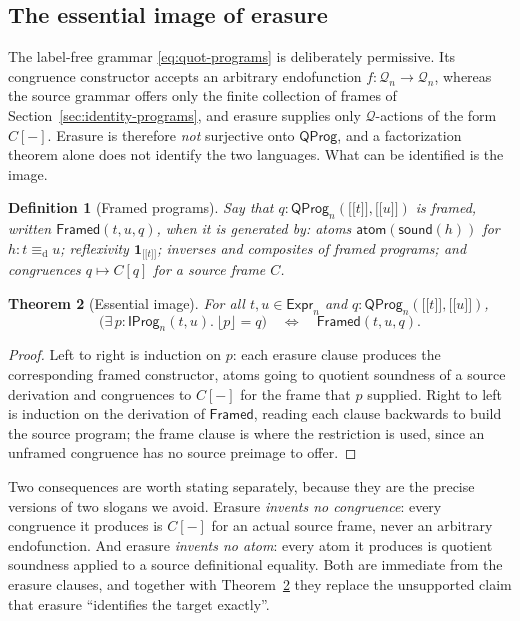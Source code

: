 \documentclass[10pt,reqno]{amsart}
\newtheorem{theorem}{Theorem}[section]
\newtheorem{definition}[theorem]{Definition}
\newcommand{\Expr}{\mathsf{Expr}}
\newcommand{\IProg}{\mathsf{IProg}}
\newcommand{\den}[1]{\mathopen{\lbrack\!\lbrack}#1\mathclose{\rbrack\!\rbrack}}
\newcommand{\defeq}{\mathrel{\equiv_{\mathrm d}}}
\newcommand{\QProg}{\mathsf{QProg}}
\newcommand{\Framed}{\mathsf{Framed}}
\newcommand{\Q}{\mathcal{Q}}
\begin{document}
\subsection{The essential image of erasure}
\label{subsec:erasure-image}

The label-free grammar \eqref{eq:quot-programs} is deliberately permissive.  Its
congruence constructor accepts an arbitrary endofunction \(f:\Q_n\to\Q_n\),
whereas the source grammar offers only the finite collection of frames of
Section~\ref{sec:identity-programs}, and erasure supplies only \(\Q\)-actions of
the form \(C[-]\).  Erasure is therefore \emph{not} surjective onto
\(\QProg\), and a factorization theorem alone does not identify the two
languages.  What can be identified is the image.

\begin{definition}[Framed programs]
\label{def:framed}
Say that \(q:\QProg_n(\den t,\den u)\) is \emph{framed}, written
\(\Framed(t,u,q)\), when it is generated by:
atoms \(\mathsf{atom}(\mathsf{sound}(h))\) for \(h:t\defeq u\); reflexivity
\(\mathbf1_{\den t}\); inverses and composites of framed programs; and
congruences \(q\mapsto C[q]\) for a source frame \(C\).
\end{definition}

\begin{theorem}[Essential image]
\label{thm:erasure-image}
For all \(t,u\in\Expr_n\) and \(q:\QProg_n(\den t,\den u)\),
\[
 \bigl(\exists\,p:\IProg_n(t,u).\ \lfloor p\rfloor=q\bigr)
 \quad\Longleftrightarrow\quad
 \Framed(t,u,q).
\tag{9.5}\label{eq:erasure-image}
\]
\end{theorem}

\begin{proof}
Left to right is induction on \(p\): each erasure clause produces the
corresponding framed constructor, atoms going to quotient soundness of a source
derivation and congruences to \(C[-]\) for the frame that \(p\) supplied.  Right
to left is induction on the derivation of \(\Framed\), reading each clause
backwards to build the source program; the frame clause is where the restriction
is used, since an unframed congruence has no source preimage to offer.
\end{proof}

Two consequences are worth stating separately, because they are the precise
versions of two slogans we avoid.  Erasure \emph{invents no congruence}: every
congruence it produces is \(C[-]\) for an actual source frame, never an
arbitrary endofunction.  And erasure \emph{invents no atom}: every atom it
produces is quotient soundness applied to a source definitional equality.  Both
are immediate from the erasure clauses, and together with
Theorem~\ref{thm:erasure-image} they replace the unsupported claim that erasure
``identifies the target exactly''.
\end{document}
